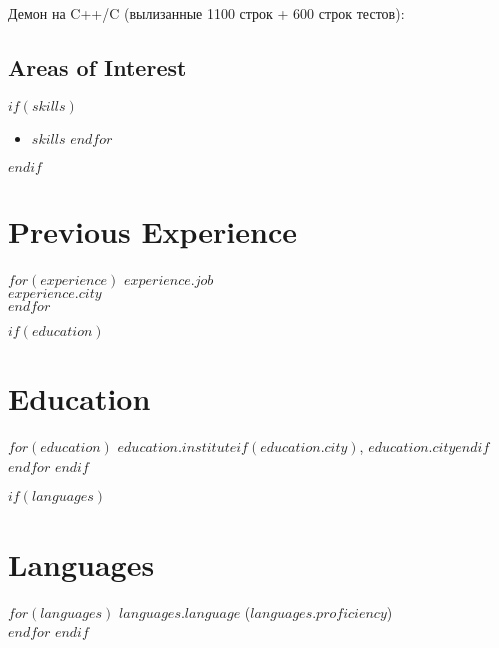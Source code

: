 \documentclass[$fontsize$, a4paper]{article}
\begin{document}
Демон на C++/C (вылизанные 1100 строк + 600 строк тестов):\\


\subsection*{Areas of Interest}
$if(skills)$
\begin{itemize}
    $for(skills)$
      \item $skills$
    $endfor$
\end{itemize}
$endif$


\vspace{25pt}

\section*{Previous Experience}
\noindent
$for(experience)$
\emph{$experience.job$}\\
$experience.city$\\[.2cm]
$endfor$

$if(education)$
\section*{Education}
\noindent
$for(education)$
\emph{$education.institute$}$if(education.city)$, $education.city$$endif$\\[.2cm]
$endfor$
$endif$

$if(languages)$
\section*{Languages}
$for(languages)$
\emph{$languages.language$} ($languages.proficiency$)\\
$endfor$
$endif$
\end{document}
